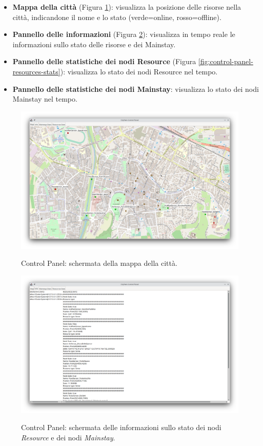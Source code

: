 \documentclass{scrartcl}
\begin{document}
\begin{itemize}
    \item \textbf{Mappa della città} (Figura \ref{fig:control-panel-map}): visualizza la posizione delle risorse nella città, indicandone il nome e lo stato (verde=online, rosso=offline).
    \item \textbf{Pannello delle informazioni} (Figura \ref{fig:control-panel-info}): visualizza in tempo reale le informazioni sullo stato delle risorse e dei Mainstay.
    \item \textbf{Pannello delle statistiche dei nodi Resource} (Figura \ref{fig:control-panel-resources-stats}): visualizza lo stato dei nodi Resource nel tempo.
    \item \textbf{Pannello delle statistiche dei nodi Mainstay}: visualizza lo stato dei nodi Mainstay nel tempo.
\end{itemize}

\begin{figure}[H]
    \caption{Control Panel: schermata della mappa della città.}
    \includegraphics[width=\textwidth]{../assets/images/control-panel-map.png}
    \label{fig:control-panel-map}
\end{figure}

\begin{figure}[H]
    \caption{Control Panel: schermata delle informazioni sullo stato dei nodi \textit{Resource} e dei nodi \textit{Mainstay}.}
    \includegraphics[width=\textwidth]{../assets/images/control-panel-info.png}
    \label{fig:control-panel-info}
\end{figure}
\end{document}
